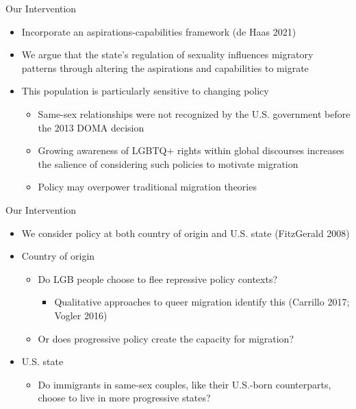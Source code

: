\documentclass[
  ignorenonframetext,
]{beamer}
\providecommand{\tightlist}{%
  \setlength{\itemsep}{0pt}\setlength{\parskip}{0pt}}
\begin{document}
\begin{frame}{Our Intervention}
\protect\hypertarget{our-intervention}{}
\begin{itemize}
\tightlist
\item
  Incorporate an aspirations-capabilities framework (de Haas 2021)
\item
  We argue that the state's regulation of sexuality influences migratory
  patterns through altering the aspirations and capabilities to migrate
\item
  This population is particularly sensitive to changing policy

  \begin{itemize}
  \tightlist
  \item
    Same-sex relationships were not recognized by the U.S. government
    before the 2013 DOMA decision
  \item
    Growing awareness of LGBTQ+ rights within global discourses
    increases the salience of considering such policies to motivate
    migration
  \item
    Policy may overpower traditional migration theories
  \end{itemize}
\end{itemize}
\end{frame}

\begin{frame}{Our Intervention}
\protect\hypertarget{our-intervention-1}{}
\begin{itemize}
\tightlist
\item
  We consider policy at both country of origin and U.S. state
  (FitzGerald 2008)
\item
  Country of origin

  \begin{itemize}
  \tightlist
  \item
    Do LGB people choose to flee repressive policy contexts?

    \begin{itemize}
    \tightlist
    \item
      Qualitative approaches to queer migration identify this (Carrillo
      2017; Vogler 2016)
    \end{itemize}
  \item
    Or does progressive policy create the capacity for migration?
  \end{itemize}
\item
  U.S. state

  \begin{itemize}
  \tightlist
  \item
    Do immigrants in same-sex couples, like their U.S.-born
    counterparts, choose to live in more progressive states?
  \end{itemize}
\end{itemize}
\end{frame}
\end{document}
